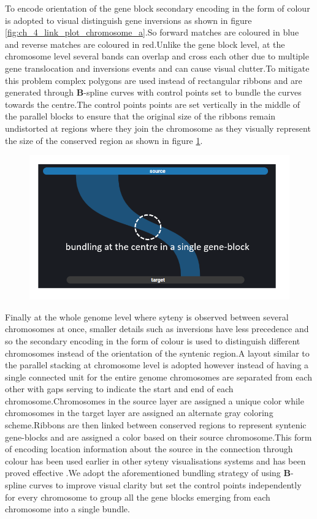 To encode orientation of the gene block secondary encoding in the form of colour is adopted to visual distinguish gene inversions as shown in figure \ref{fig:ch_4_link_plot_chromosome_a}.So forward matches are coloured in blue and reverse matches are coloured in red.Unlike the gene block level, at the chromosome level several bands can overlap and cross each other due to multiple gene translocation and inversions events and can cause visual clutter.To mitigate this problem complex polygons are used instead of rectangular ribbons and are generated through \textbf{B}-spline curves\cite{ref851370272} with control points set to bundle the curves towards the centre.The control points points are set vertically in the middle of the parallel blocks to ensure that the original size of the ribbons remain undistorted at regions where they join the chromosome as they visually represent the size of the conserved region as shown in figure \ref{fig:ch_4_link_plot_chromosome_b}. 

\begin{figure}
  \centering
  \includegraphics[width=.50\linewidth]{images/ch_4_link_plot_chromosome_b.PNG}
  \label{fig:ch_4_link_plot_chromosome_b}
\end{figure}


Finally at the whole genome level where syteny is observed between several chromosomes at once, smaller details such as inversions have less precedence and so the secondary encoding in the form of colour is used to distinguish different chromosomes instead of the orientation of the syntenic region.A layout similar to the parallel stacking at chromosome level is adopted however instead of having a single connected unit for the entire genome chromosomes are separated from each other with gaps serving to indicate the start and end of each chromosome.Chromosomes in the source layer are assigned a unique color while chromosomes in the target layer are assigned an alternate gray coloring scheme.Ribbons are then linked between conserved regions to represent syntenic gene-blocks and are assigned a color based on their source chromosome.This form of encoding location information about the source in the connection through colour has been used earlier in other syteny visualisations systems and has been proved effective \cite{Meyer2009}.We adopt the aforementioned bundling strategy of using \textbf{B}-spline curves\cite{ref851370272} to improve visual clarity but set the control points independently for every chromosome to group all the gene blocks emerging from each chromosome into a single bundle.


